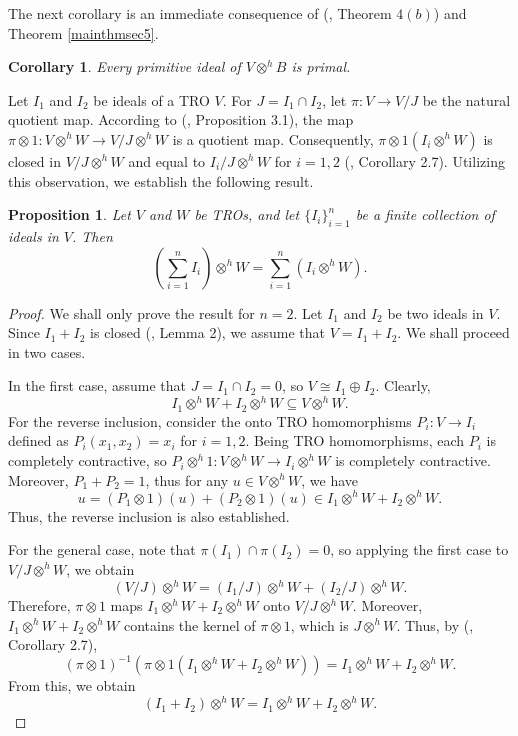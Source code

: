 \documentclass{birkjour}
\newtheorem{cor}[thm]{Corollary}
\newtheorem{prop}[thm]{Proposition}
\theoremstyle{definition}
\theoremstyle{remark}
\numberwithin{equation}{section}
\begin{document}
The next corollary is an immediate consequence of (\cite{AA}, Theorem $4(b)$) and Theorem \ref{mainthmsec5}. 


\begin{cor}
   Every primitive ideal of $V \otimes^h B$ is primal. 
\end{cor}







Let \( I_1 \) and \( I_2 \) be ideals of a TRO \( V \). For \( J = I_1 \cap I_2 \), let \( \pi: V \to V/J \) be the natural quotient map. According to (\cite{ERR}, Proposition 3.1), the map \( \pi \otimes 1: V \otimes^h W \to V/J \otimes^h W \) is a quotient map. Consequently, \( \pi \otimes 1 (I_i \otimes^h W) \) is closed in \( V/J \otimes^h W \) and equal to \( I_i/J \otimes^h W \) for \( i = 1, 2 \) (\cite{AS}, Corollary 2.7). Utilizing this observation, we establish the following result.

\begin{prop} \label{result6}
Let \( V \) and \( W \) be TROs, and let \( \{I_i\}_{i=1}^n \) be a finite collection of ideals in \( V \). Then 
\[ \left( \sum_{i=1}^n I_i \right) \otimes^h W = \sum_{i=1}^n (I_i \otimes^h W). \]
\end{prop}

\begin{proof}
We shall only prove the result for \( n=2 \). Let \( I_1 \) and \( I_2 \) be two ideals in \( V \). Since \( I_1 + I_2 \) is closed (\cite{AA}, Lemma 2), we assume that \( V = I_1 + I_2 \). We shall proceed in two cases.

In the first case, assume that \( J = I_1 \cap I_2 = 0 \), so \( V \cong I_1 \oplus I_2 \). Clearly,
\[ I_1 \otimes^h W + I_2 \otimes^h W \subseteq V \otimes^h W. \]
For the reverse inclusion, consider the onto TRO homomorphisms \( P_i: V \to I_i \) defined as \( P_i(x_1, x_2) = x_i \) for \( i = 1, 2 \). Being TRO homomorphisms, each \( P_i \) is completely contractive, so \( P_i \otimes^h 1 : V \otimes^h W \to I_i \otimes^h W \) is completely contractive. Moreover, \( P_1 + P_2 = 1 \), thus for any \( u \in V \otimes^h W \), we have 
\[ u = (P_1 \otimes 1)(u) + (P_2 \otimes 1)(u) \in I_1 \otimes^h W + I_2 \otimes^h W. \]
Thus, the reverse inclusion is also established.

For the general case, note that \( \pi(I_1) \cap \pi(I_2) = 0 \), so applying the first case to \( V/J \otimes^h W \), we obtain 
\[ (V/J) \otimes^h W = (I_1/J) \otimes^h W + (I_2/J) \otimes^h W. \]
Therefore, \( \pi \otimes 1 \) maps \( I_1 \otimes^h W + I_2 \otimes^h W \) onto \( V/J \otimes^h W \). Moreover, \( I_1 \otimes^h W + I_2 \otimes^h W \) contains the kernel of \( \pi \otimes 1 \), which is \( J \otimes^h W \). Thus, by (\cite{AS}, Corollary 2.7),
\[ (\pi \otimes 1)^{-1}(\pi \otimes 1(I_1 \otimes^h W + I_2 \otimes^h W)) = I_1 \otimes^h W + I_2 \otimes^h W. \]
From this, we obtain 
\[ (I_1 + I_2) \otimes^h W = I_1 \otimes^h W + I_2 \otimes^h W. \]
\end{proof}
\end{document}
